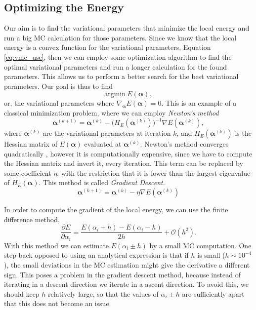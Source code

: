 \documentclass[aps,reprint,superscriptaddress,nofootinbib]{revtex4-2}
\begin{document}
\subsection*{Optimizing the Energy}

    Our aim is to find the variational parameters that minimize the local energy and run a big MC calculation for those parameters. Since we know that the local energy is a convex function for the variational parameters, Equation \eqref{eq:vmc_use}, then we can employ some optimization algorithm to find the optimal variational parameters and run a longer calculation for the found parameters. This allows us to perform a better search for the best variational parameters. Our goal is thus to find
    \begin{equation*}
        \text{argmin}\ E(\bm \alpha),
    \end{equation*}
    or, the variational parameters where \(\nabla_{\bm \alpha} E(\bm \alpha) = 0\). This is an example of a classical minimization problem, where we can employ \textit{Newton's method} \cite{num_anal_mayers}
    \begin{equation*}
        \bm{\alpha}^{(k+1)}=\bm{\alpha}^{(k)}-\big(H_E(\bm{\alpha}^{(k)})\big)^{-1}\nabla E(\bm{\alpha}^{(k)}),
    \end{equation*}
    where \(\bm{\alpha}^{(k)}\) are the variational parameters at iteration \(k\), and \(H_E(\bm{\alpha}^{(k)})\) is the Hessian matrix of \(E(\bm \alpha)\) evaluated at \(\bm{\alpha}^{(k)}\). Newton's method converges quadratically \cite{num_anal_mayers}, however it is computationally expensive, since we have to compute the Hessian matrix and invert it, every iteration. This term can be replaced by some coefficient \(\eta\), with the restriction that it is lower than the largest eigenvalue of \(H_E(\bm{\alpha})\). This method is called \textit{Gradient Descent}. 
    \begin{equation*}
        \bm{\alpha}^{(k+1)}=\bm{\alpha}^{(k)}-\eta \nabla E(\bm{\alpha}^{(k)})
    \end{equation*}
    
    In order to compute the gradient of the local energy, we can use the finite difference method,
    \begin{equation*}
        \frac{\partial E}{\partial \alpha_i} = \frac{E(\alpha_i + h) - E(\alpha_i - h)}{2h} + \mathcal{O}(h^2).
    \end{equation*}
    With this method we can estimate \(E(\alpha_i \pm h)\) by a small MC computation. One step-back opposed to using an analytical expression is that if \(h\) is small (\(h \sim 10^{-4}\)), the small deviations in the MC estimation might give the derivative a different sign. This poses a problem in the gradient descent method, because instead of iterating in a descent direction we iterate in a ascent direction. To avoid this, we should keep \(h\) relatively large, so that the values of \(\alpha_i \pm h\) are sufficiently apart that this does not become an issue.
    
\end{document}
